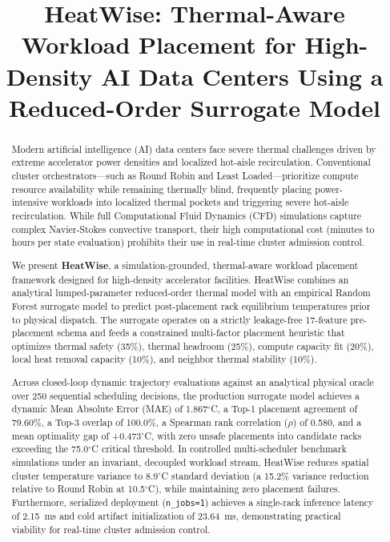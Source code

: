 \documentclass[conference,10pt]{IEEEtran}
\begin{document}
\title{HeatWise: Thermal-Aware Workload Placement for High-Density AI Data Centers Using a Reduced-Order Surrogate Model}

\author{
}

\maketitle

\begin{abstract}
Modern artificial intelligence (AI) data centers face severe thermal challenges driven by extreme accelerator power densities and localized hot-aisle recirculation. Conventional cluster orchestrators---such as Round Robin and Least Loaded---prioritize compute resource availability while remaining thermally blind, frequently placing power-intensive workloads into localized thermal pockets and triggering severe hot-aisle recirculation. While full Computational Fluid Dynamics (CFD) simulations capture complex Navier-Stokes convective transport, their high computational cost (minutes to hours per state evaluation) prohibits their use in real-time cluster admission control.

We present \textbf{HeatWise}, a simulation-grounded, thermal-aware workload placement framework designed for high-density accelerator facilities. HeatWise combines an analytical lumped-parameter reduced-order thermal model with an empirical Random Forest surrogate model to predict post-placement rack equilibrium temperatures prior to physical dispatch. The surrogate operates on a strictly leakage-free 17-feature pre-placement schema and feeds a constrained multi-factor placement heuristic that optimizes thermal safety (35\%), thermal headroom (25\%), compute capacity fit (20\%), local heat removal capacity (10\%), and neighbor thermal stability (10\%).

Across closed-loop dynamic trajectory evaluations against an analytical physical oracle over 250 sequential scheduling decisions, the production surrogate model achieves a dynamic Mean Absolute Error (MAE) of 1.867$^\circ$C, a Top-1 placement agreement of 79.60\%, a Top-3 overlap of 100.0\%, a Spearman rank correlation ($\rho$) of 0.580, and a mean optimality gap of +0.473$^\circ$C, with zero unsafe placements into candidate racks exceeding the 75.0$^\circ$C critical threshold. In controlled multi-scheduler benchmark simulations under an invariant, decoupled workload stream, HeatWise reduces spatial cluster temperature variance to 8.9$^\circ$C standard deviation (a 15.2\% variance reduction relative to Round Robin at 10.5$^\circ$C), while maintaining zero placement failures. Furthermore, serialized deployment (\texttt{n\_jobs=1}) achieves a single-rack inference latency of 2.15~ms and cold artifact initialization of 23.64~ms, demonstrating practical viability for real-time cluster admission control.
\end{abstract}
\end{document}

